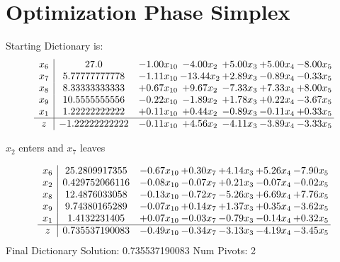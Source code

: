 \documentclass[9pt]{article}
\begin{document}
\section{Optimization Phase Simplex}
Starting Dictionary is:
\[\begin{array}{c| c c@{\hskip 2pt} c@{\hskip 2pt} c@{\hskip 2pt} c@{\hskip 2pt} c@{\hskip 2pt} }
 x_{6}   &  27.0 & -1.00 x_{10} & -4.00 x_{2} & +  5.00 x_{3} & +  5.00 x_{4} & -8.00 x_{5}\\
 x_{7}   &  5.77777777778 & -1.11 x_{10} & -13.44 x_{2} & +  2.89 x_{3} & -0.89 x_{4} & -0.33 x_{5}\\
 x_{8}   &  8.33333333333 & +  0.67 x_{10} & +  9.67 x_{2} & -7.33 x_{3} & +  7.33 x_{4} & +  8.00 x_{5}\\
 x_{9}   &  10.5555555556 & -0.22 x_{10} & -1.89 x_{2} & +  1.78 x_{3} & +  0.22 x_{4} & -3.67 x_{5}\\
 x_{1}   &  1.22222222222 & +  0.11 x_{10} & +  0.44 x_{2} & -0.89 x_{3} & -0.11 x_{4} & +  0.33 x_{5}\\
\hline
z    &  -1.22222222222 & -0.11 x_{10} & +  4.56 x_{2} & -4.11 x_{3} & -3.89 x_{4} & -3.33 x_{5}\\
\end{array}\]


 $ x_{2} $ enters and $ x_{7} $ leaves 

 \[\begin{array}{c| c c@{\hskip 2pt} c@{\hskip 2pt} c@{\hskip 2pt} c@{\hskip 2pt} c@{\hskip 2pt} }
 x_{6}   &  25.2809917355 & -0.67 x_{10} & +  0.30 x_{7} & +  4.14 x_{3} & +  5.26 x_{4} & -7.90 x_{5}\\
 x_{2}   &  0.429752066116 & -0.08 x_{10} & -0.07 x_{7} & +  0.21 x_{3} & -0.07 x_{4} & -0.02 x_{5}\\
 x_{8}   &  12.4876033058 & -0.13 x_{10} & -0.72 x_{7} & -5.26 x_{3} & +  6.69 x_{4} & +  7.76 x_{5}\\
 x_{9}   &  9.74380165289 & -0.07 x_{10} & +  0.14 x_{7} & +  1.37 x_{3} & +  0.35 x_{4} & -3.62 x_{5}\\
 x_{1}   &  1.4132231405 & +  0.07 x_{10} & -0.03 x_{7} & -0.79 x_{3} & -0.14 x_{4} & +  0.32 x_{5}\\
\hline
z    &  0.735537190083 & -0.49 x_{10} & -0.34 x_{7} & -3.13 x_{3} & -4.19 x_{4} & -3.45 x_{5}\\
\end{array}\]
Final Dictionary
Solution:  0.735537190083
Num Pivots:  2
\end{document}
